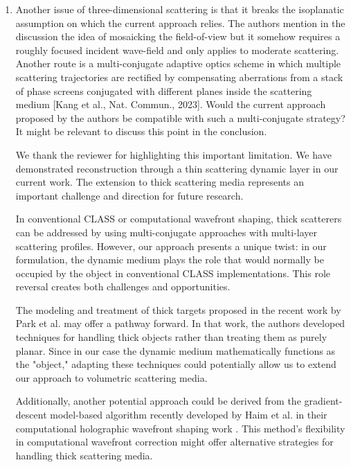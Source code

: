 \documentclass[12pt]{article}
\newenvironment{solved_reviewercomment}
    {\begin{tcolorbox}[width=\linewidth,colback=gray!5,colframe=solved_commentcolor!50,title=Reviewer Comment,left=5pt,right=5pt]}
    {\end{tcolorbox}}
\newenvironment{ourresponse}
    {\begin{tcolorbox}[width=\linewidth,breakable,enhanced,colback=gray!5,colframe=responsecolor!50,title=Response,left=5pt,right=5pt]}
    {\end{tcolorbox}}
\begin{document}
\begin{enumerate}[label=\arabic*.]
   
\item \leavevmode\vspace{-\baselineskip}
\begin{solved_reviewercomment}
    Another issue of three-dimensional scattering is that it breaks the isoplanatic assumption on which the current approach relies. The authors mention in the discussion the idea of mosaicking the field-of-view but it somehow requires a roughly focused incident wave-field and only applies to moderate scattering. Another route is a multi-conjugate adaptive optics scheme in which multiple scattering trajectories are rectified by compensating aberrations from a stack of phase screens conjugated with different planes inside the scattering medium [Kang et al., Nat. Commun., 2023]. Would the current approach proposed by the authors be compatible with such a multi-conjugate strategy? It might be relevant to discuss this point in the conclusion.
\end{solved_reviewercomment}

\begin{ourresponse}
    We thank the reviewer for highlighting this important limitation. We have demonstrated reconstruction through a thin scattering dynamic layer in our current work. The extension to thick scattering media represents an important challenge and direction for future research.

    In conventional CLASS or computational wavefront shaping, thick scatterers can be addressed by using multi-conjugate approaches with multi-layer scattering profiles. However, our approach presents a unique twist: in our formulation, the dynamic medium plays the role that would normally be occupied by the object in conventional CLASS implementations. This role reversal creates both challenges and opportunities.
    
    The modeling and treatment of thick targets proposed in the recent work by Park et al. \cite{oh2025digital} may offer a pathway forward. In that work, the authors developed techniques for handling thick objects rather than treating them as purely planar. Since in our case the dynamic medium mathematically functions as the "object," adapting these techniques could potentially allow us to extend our approach to volumetric scattering media.

    Additionally, another potential approach could be derived from the gradient-descent model-based algorithm recently developed by Haim et al. in their computational holographic wavefront shaping work \cite{haim2025image}. This method's flexibility in computational wavefront correction might offer alternative strategies for handling thick scattering media.
    

\end{ourresponse}
\end{enumerate}
\end{document}
